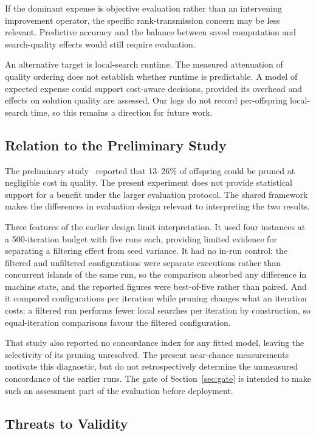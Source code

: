 \documentclass[a4paper,fleqn]{cas-dc}
\begin{document}
If the dominant expense is objective evaluation rather than an intervening
improvement operator, the specific rank-transmission concern may be less
relevant. Predictive accuracy and the balance between saved computation and
search-quality effects would still require evaluation.

An alternative target is local-search runtime. The measured attenuation of
quality ordering does not establish whether runtime is predictable. A model of
expected expense could support cost-aware decisions, provided its overhead and
effects on solution quality are assessed. Our logs do not record per-offspring
local-search time, so this remains a direction for future work.

\subsection{Relation to the Preliminary Study}\label{sec:disc-prelim}

The preliminary study~\citep{balemir2026lacetsp} reported that 13--26\% of
offspring could be pruned at negligible cost in quality. The present experiment
does not provide statistical support for a benefit under the larger evaluation
protocol. The shared framework makes the differences in evaluation design
relevant to interpreting the two results.

Three features of the earlier design limit interpretation. It used
four instances at a 500-iteration budget with five runs each, providing limited
evidence for separating a filtering effect from seed variance. It had no
in-run control: the filtered and unfiltered configurations were separate
executions rather than concurrent islands of the same run, so the comparison
absorbed any difference in machine state, and the reported figures were
best-of-five rather than paired. And it compared configurations per iteration
while pruning changes what an iteration costs: a filtered run performs fewer
local searches per iteration by construction, so equal-iteration comparisons
favour the filtered configuration.

That study also reported no concordance index for any fitted model, leaving the
selectivity of its pruning unresolved. The present near-chance measurements
motivate this diagnostic, but do not retrospectively determine the unmeasured
concordance of the earlier runs. The gate of Section~\ref{sec:gate} is intended
to make such an assessment part of the evaluation before deployment.

\subsection{Threats to Validity}\label{sec:disc-threats}
\end{document}
